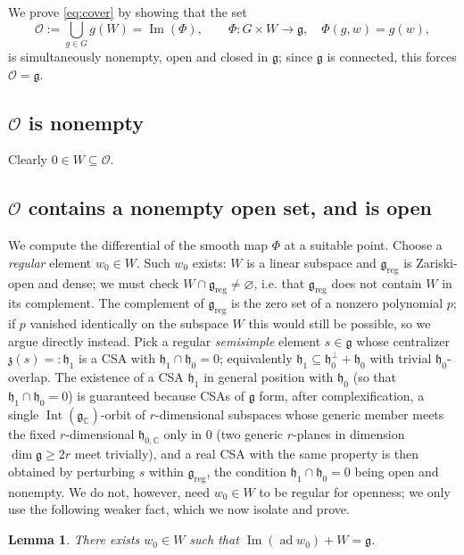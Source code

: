 \documentclass{amsart}
\newtheorem{lemma}{Lemma}
\theoremstyle{definition}
\begin{document}
We prove \eqref{eq:cover} by showing that the set
\[
  \mathcal O:=\bigcup_{g\in G} g(W)=\operatorname{Im}(\Phi),\qquad
  \Phi: G\times W\to\mathfrak g,\quad \Phi(g,w)=g(w),
\]
is simultaneously nonempty, open and closed in $\mathfrak g$; since $\mathfrak g$ is
connected, this forces $\mathcal O=\mathfrak g$.

\subsection*{$\mathcal O$ is nonempty}
Clearly $0\in W\subseteq\mathcal O$.

\subsection*{$\mathcal O$ contains a nonempty open set, and is open}
We compute the differential of the smooth map $\Phi$ at a suitable point. Choose a
\emph{regular} element $w_0\in W$. Such $w_0$ exists: $W$ is a linear subspace and
$\mathfrak g_{\mathrm{reg}}$ is Zariski-open and dense; we must check
$W\cap\mathfrak g_{\mathrm{reg}}\neq\varnothing$, i.e. that
$\mathfrak g_{\mathrm{reg}}$ does not contain $W$ in its complement. The complement
of $\mathfrak g_{\mathrm{reg}}$ is the zero set of a nonzero polynomial $p$; if $p$
vanished identically on the subspace $W$ this would still be possible, so we argue
directly instead. Pick a regular \emph{semisimple} element $s\in\mathfrak g$ whose
centralizer $\mathfrak z(s)=:\mathfrak h_1$ is a CSA with
$\mathfrak h_1\cap\mathfrak h_0=0$; equivalently
$\mathfrak h_1\subseteq\mathfrak h_0^{\perp}\!+\!\mathfrak h_0$ with trivial
$\mathfrak h_0$-overlap. The existence of a CSA $\mathfrak h_1$ in general position
with $\mathfrak h_0$ (so that $\mathfrak h_1\cap\mathfrak h_0=0$) is guaranteed
because CSAs of $\mathfrak g$ form, after complexification, a single
$\operatorname{Int}(\mathfrak g_{\mathbb C})$-orbit of $r$-dimensional subspaces
whose generic member meets the fixed $r$-dimensional $\mathfrak h_{0,\mathbb C}$
only in $0$ (two generic $r$-planes in dimension $\dim\mathfrak g\ge 2r$ meet
trivially), and a real CSA with the same property is then obtained by perturbing
$s$ within $\mathfrak g_{\mathrm{reg}}$, the condition
$\mathfrak h_1\cap\mathfrak h_0=0$ being open and nonempty. We do not, however,
need $w_0\in W$ to be regular for openness; we only use the following weaker
fact, which we now isolate and prove.

\begin{lemma}\label{lem:diff-onto}
There exists $w_0\in W$ such that
$\operatorname{Im}(\operatorname{ad}w_0)+W=\mathfrak g$.
\end{lemma}
\end{document}
